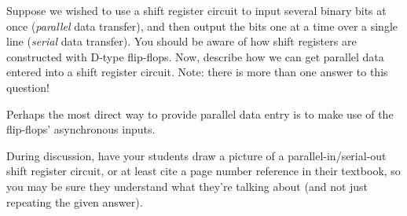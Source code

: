 

Suppose we wished to use a shift register circuit to input several binary bits at once ({\it parallel} data transfer), and then output the bits one at a time over a single line ({\it serial} data transfer).  You should be aware of how shift registers are constructed with D-type flip-flops.  Now, describe how we can get parallel data entered into a shift register circuit.  Note: there is more than one answer to this question!







Perhaps the most direct way to provide parallel data entry is to make use of the flip-flops' asynchronous inputs.







During discussion, have your students draw a picture of a parallel-in/serial-out shift register circuit, or at least cite a page number reference in their textbook, so you may be sure they understand what they're talking about (and not just repeating the given answer).





